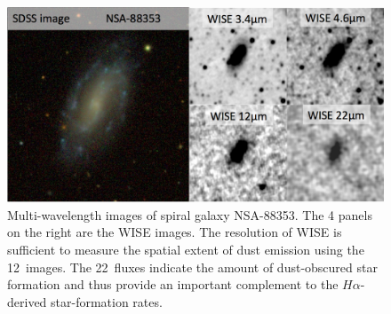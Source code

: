 \documentclass[11pt, preprint]{aastex}
\newcommand{\ha}{$H\alpha$}
\newcommand{\sers}{{\it S\'{e}rsic}}
\begin{document}
{%



\begin{figure}[h]
\begin{center}
\includegraphics[width=.85\textwidth]{NSA-88353.png}
\end{center}
\caption{ Multi-wavelength images of spiral galaxy NSA-88353.  The 
  4 panels on the right are the WISE images. The resolution of WISE is
sufficient to measure the spatial extent of dust emission using the
12\micron \ images.  The 22\micron \ fluxes indicate the amount of
dust-obscured star formation and thus provide an important complement
to the \ha-derived star-formation rates.}
\label{figwise}
\end{figure}

}
\end{document}
